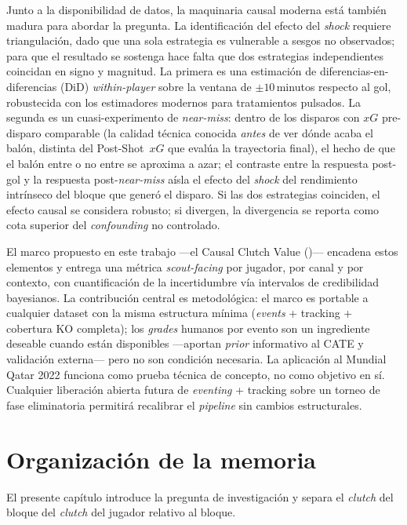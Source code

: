Junto a la disponibilidad de datos, la maquinaria causal moderna está
también madura para abordar la pregunta. La identificación del efecto
del \textit{shock} requiere triangulación, dado que una sola estrategia
es vulnerable a sesgos no observados; para que el resultado se sostenga
hace falta que dos estrategias independientes coincidan en signo y
magnitud.
La primera es una estimación de diferencias-en-diferencias (DiD)
\textit{within-player} sobre la ventana de $\pm 10$\,minutos respecto al
gol, robustecida con los estimadores modernos para tratamientos
pulsados. La segunda es un cuasi-experimento de \textit{near-miss}:
dentro de los disparos con $xG$ pre-disparo comparable (la calidad
técnica conocida \textit{antes} de ver dónde acaba el balón, distinta
del Post-Shot~$xG$ que evalúa la trayectoria final), el hecho de que el
balón entre o no entre se aproxima a azar; el contraste entre la
respuesta post-gol y la respuesta post-\textit{near-miss} aísla el
efecto del \textit{shock} del rendimiento intrínseco del bloque que
generó el disparo. Si las dos estrategias coinciden, el efecto causal
se considera robusto; si divergen, la divergencia se reporta como cota
superior del \textit{confounding} no controlado.

El marco propuesto en este trabajo ---el Causal Clutch Value (\CCV)---
encadena estos elementos y entrega una métrica \textit{scout-facing}
por jugador, por canal y por contexto, con cuantificación de la
incertidumbre vía intervalos de credibilidad bayesianos. La contribución
central es metodológica: el marco es portable a cualquier dataset con la
misma estructura mínima (\textit{events} + tracking + cobertura KO
completa); los \textit{grades} humanos por evento son un ingrediente
deseable cuando están disponibles ---aportan \textit{prior} informativo
al CATE y validación externa--- pero no son condición necesaria. La
aplicación al Mundial Qatar 2022 funciona como prueba técnica de
concepto, no como objetivo en sí. Cualquier liberación abierta futura
de \textit{eventing} + tracking sobre un torneo de fase eliminatoria
permitirá recalibrar el \textit{pipeline} \CCV sin cambios
estructurales.


\section{Organización de la memoria}
\label{sec:organizacion}

El presente capítulo introduce la pregunta de investigación y separa el
\textit{clutch} del bloque del \textit{clutch} del jugador relativo al
bloque.

